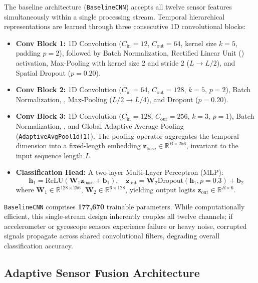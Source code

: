 The baseline architecture (\texttt{BaselineCNN}) accepts all twelve sensor features simultaneously within a single processing stream. Temporal hierarchical representations are learned through three consecutive 1D convolutional blocks:
\begin{itemize}
    \item \textbf{Conv Block 1:} 1D Convolution ($C_{\text{in}}=12$, $C_{\text{out}}=64$, kernel size $k=5$, padding $p=2$), followed by Batch Normalization, Rectified Linear Unit () activation, Max-Pooling with kernel size 2 and stride 2 ($L \to L/2$), and Spatial Dropout ($p=0.20$).
    \item \textbf{Conv Block 2:} 1D Convolution ($C_{\text{in}}=64$, $C_{\text{out}}=128$, $k=5$, $p=2$), Batch Normalization, , Max-Pooling ($L/2 \to L/4$), and Dropout ($p=0.20$).
    \item \textbf{Conv Block 3:} 1D Convolution ($C_{\text{in}}=128$, $C_{\text{out}}=256$, $k=3$, $p=1$), Batch Normalization, , and Global Adaptive Average Pooling (\texttt{AdaptiveAvgPool1d(1)}). The pooling operator aggregates the temporal dimension into a fixed-length embedding $\mathbf{z}_{\text{base}} \in \mathbb{R}^{B \times 256}$, invariant to the input sequence length $L$.
    \item \textbf{Classification Head:} A two-layer Multi-Layer Perceptron (MLP):
    \begin{equation}
        \mathbf{h}_1 = \text{ReLU}(\mathbf{W}_1 \mathbf{z}_{\text{base}} + \mathbf{b}_1), \quad \mathbf{z}_{\text{out}} = \mathbf{W}_2 \text{Dropout}(\mathbf{h}_1, p=0.3) + \mathbf{b}_2
    \end{equation}
    where $\mathbf{W}_1 \in \mathbb{R}^{128 \times 256}$, $\mathbf{W}_2 \in \mathbb{R}^{6 \times 128}$, yielding output logits $\mathbf{z}_{\text{out}} \in \mathbb{R}^{B \times 6}$.
\end{itemize}

\texttt{BaselineCNN} comprises \textbf{177,670} trainable parameters. While computationally efficient, this single-stream design inherently couples all twelve channels; if accelerometer or gyroscope sensors experience failure or heavy noise, corrupted signals propagate across shared convolutional filters, degrading overall classification accuracy.

\subsection{Adaptive Sensor Fusion Architecture}
\label{subsec:adaptive_fusion_architecture}

